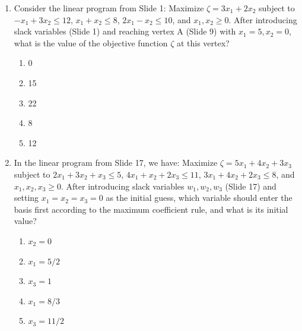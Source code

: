 \documentclass{article}%
\begin{document}
\begin{enumerate}
\begin{enumerate}
\begin{enumerate}%
\item A value of 0 indicates feasibility; the solution to the auxiliary problem provides a feasible starting point for the original problem.%
\item A value of 0 indicates infeasibility; the original problem has no solution.%
\item A value of 0 is arbitrary; any value would lead to a feasible solution for the original problem.%
\item A value of 0 indicates unboundedness; the original problem has an unbounded solution.%
\item A value of 0 is an error; the auxiliary problem must have a positive objective function value.%
\end{enumerate}%
\vspace{0.5em}%
\end{enumerate}%
\item Consider the linear program from Slide 1: Maximize $ \zeta = 3x_1 + 2x_2 $ subject to $ -x_1 + 3x_2 \le 12 $, $ x_1 + x_2 \le 8 $, $ 2x_1 - x_2 \le 10 $, and $ x_1, x_2 \ge 0 $. After introducing slack variables (Slide 1) and reaching vertex A (Slide 9) with $ x_1 = 5, x_2 = 0 $, what is the value of the objective function $ \zeta $ at this vertex?%
\begin{enumerate}%
\item 0%
\item 15%
\item 22%
\item 8%
\item 12%
\end{enumerate}%
\vspace{1em}%
\item In the linear program from Slide 17, we have: Maximize $ \zeta = 5x_1 + 4x_2 + 3x_3 $ subject to $ 2x_1 + 3x_2 + x_3 \le 5 $, $ 4x_1 + x_2 + 2x_3 \le 11 $, $ 3x_1 + 4x_2 + 2x_3 \le 8 $, and $ x_1, x_2, x_3 \ge 0 $.  After introducing slack variables $ w_1, w_2, w_3 $ (Slide 17) and setting $ x_1 = x_2 = x_3 = 0 $ as the initial guess, which variable should enter the basis first according to the maximum coefficient rule, and what is its initial value?%
\begin{enumerate}%
\item $ x_2 = 0 $%
\item $ x_1 = 5/2 $%
\item $ x_3 = 1 $%
\item $ x_1 = 8/3 $%
\item $ x_3 = 11/2 $%

\end{enumerate}
\end{enumerate}
\end{document}
